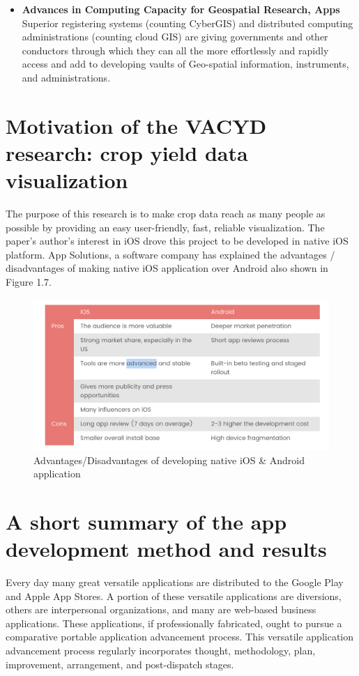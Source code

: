 \begin{itemize}
  \item  \textbf{Advances in Computing Capacity for Geospatial Research, Apps} \\
 Superior registering systems (counting CyberGIS) and distributed computing administrations (counting cloud GIS) are giving governments and other conductors through which they can all the more effortlessly and rapidly access and add to developing vaults of Geo-spatial information, instruments, and administrations.
  
\end{itemize}

\section{Motivation of the VACYD research: crop yield data visualization}

The purpose of this research is to make crop data reach as many people as possible by providing an easy user-friendly, fast, reliable visualization. The paper's author's interest in \gls{iOS} drove this project to be developed in native \gls{iOS} platform. App Solutions, a software company has explained the advantages / disadvantages of making native \gls{iOS} application over Android also shown in Figure 1.7\cite{theAPPsolutions}.

  \begin{figure}[H]
            \centering
            \includegraphics[width=0.8\linewidth]{figures/ch1/iosVSandroid.png}
            \caption{\label{fig:iosVSandroid} Advantages/Disadvantages of developing native iOS \& Android application \cite{theAPPsolutions}}
  \end{figure}


\section{A short summary of the app development method and results}

Every day many great versatile applications are distributed to the Google Play and Apple App Stores. A portion of these versatile applications are diversions, others are interpersonal organizations, and many are web-based business applications. These applications, if professionally fabricated, ought to pursue a comparative portable application advancement process. This versatile application advancement process regularly incorporates thought, methodology, plan, improvement, arrangement, and post-dispatch stages.

